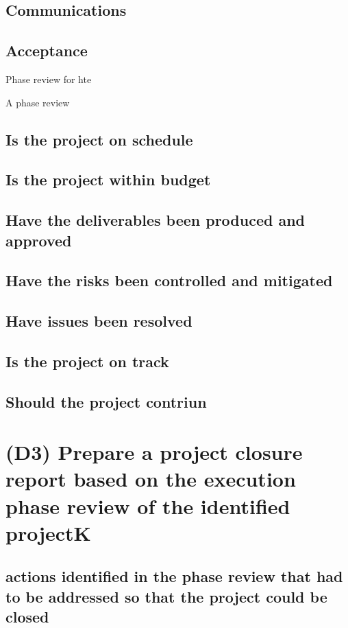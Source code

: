 \documentclass{article}
\begin{document}
\subsection{Communications}

\subsection{Acceptance}

Phase review for hte 

A phase review
		\subsection{Is the project on schedule}
		\subsection{Is the project within budget}
		\subsection{Have the deliverables been produced and approved}
		\subsection{Have the risks been controlled and mitigated}
		\subsection{Have issues been resolved}
		\subsection{Is the project on track}
		\subsection{Should the project contriun}


\section{(D3) Prepare a project closure report based on the execution phase review of the identified projectK}

\subsection{actions identified in the phase review that had to be addressed so that the project could be closed}
\end{document}

